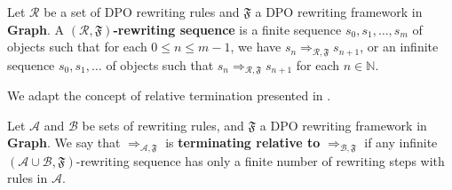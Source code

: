 \begin{definition}
    Let \(\mathcal{R}\) be a set of DPO rewriting rules and $\mathfrak{F}$ a DPO rewriting framework in \textbf{Graph}.
    A \textbf{$(\mathcal{R},\mathfrak{F})$-rewriting sequence} is a finite sequence \(s_0,s_1,\hdots, s_m\) of objects such that for each \( 0 \leq n \leq m-1\), we have \(s_n \Rightarrow_{\mathcal{R},\mathfrak{F}} s_{n+1}\), or an infinite sequence \(s_0,s_1,\hdots\) of objects such that \(s_n \Rightarrow_{\mathcal{R},\mathfrak{F}} s_{n+1}\) for each \(n \in \mathbb{N}\).
\end{definition}
We adapt the concept of relative termination presented in \cite{klop1987term,geser1990relative}.
\begin{definition}
    \label{termination:def:relative_termination}
     Let $\mathcal{A}$ and $\mathcal{B}$ be sets of rewriting rules, and $\mathfrak{F}$ a DPO rewriting framework in \textbf{Graph}. We say that $\Rightarrow_{\mathcal{A},\mathfrak{F}}$ is \textbf{terminating relative to} $\Rightarrow_{\mathcal{B}, \mathfrak{F}}$ if any infinite $(\mathcal{A} \cup \mathcal{B},\mathfrak{F})$-rewriting sequence has only a finite number of rewriting steps with rules in $\mathcal{A}$.
\end{definition}